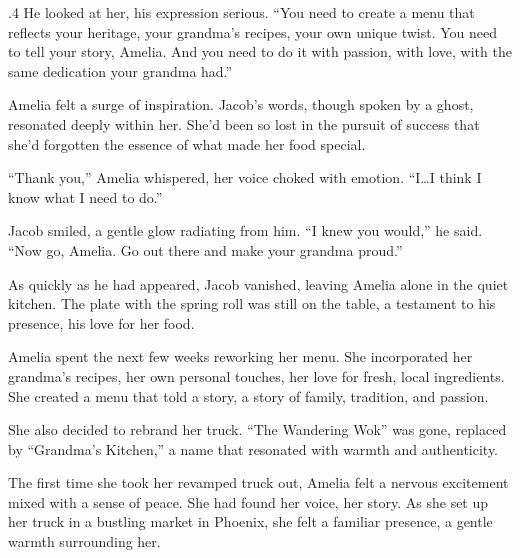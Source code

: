 \documentclass{article}
\newcommand{\baselinezs}{{\sc E2E$_{ZS}$}}
\begin{document}
\begin{tcolorbox}[colback=white, colframe=gray!30!white, coltitle=black, parskip=5mm, title=
    \textbf{System output: \baselinezs}, breakable]
\begin{spacing}{.4}
He looked at her, his expression serious. “You need to create a menu that reflects your heritage, your grandma’s recipes, your own unique twist. You need to tell your story, Amelia. And you need to do it with passion, with love, with the same dedication your grandma had.” \\\par

Amelia felt a surge of inspiration. Jacob’s words, though spoken by a ghost, resonated deeply within her. She’d been so lost in the pursuit of success that she’d forgotten the essence of what made her food special.  \\\par

“Thank you,” Amelia whispered, her voice choked with emotion. “I…I think I know what I need to do.” \\\par

Jacob smiled, a gentle glow radiating from him. “I knew you would,” he said. “Now go, Amelia. Go out there and make your grandma proud.” \\\par

As quickly as he had appeared, Jacob vanished, leaving Amelia alone in the quiet kitchen. The plate with the spring roll was still on the table, a testament to his presence, his love for her food.  \\\par

Amelia spent the next few weeks reworking her menu. She incorporated her grandma’s recipes, her own personal touches, her love for fresh, local ingredients. She created a menu that told a story, a story of family, tradition, and passion.  \\\par

She also decided to rebrand her truck. “The Wandering Wok” was gone, replaced by “Grandma’s Kitchen,” a name that resonated with warmth and authenticity. \\\par

The first time she took her revamped truck out, Amelia felt a nervous excitement mixed with a sense of peace. She had found her voice, her story. As she set up her truck in a bustling market in Phoenix, she felt a familiar presence, a gentle warmth surrounding her.  \\\par


\end{spacing}
\end{tcolorbox}
\end{document}
